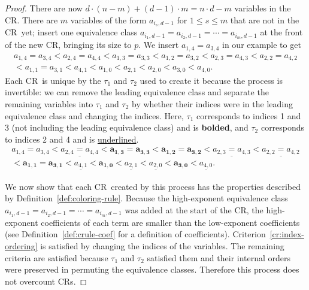\documentclass[11pt]{article}
\newcommand{\crulenospace}{CR}
\newcommand{\crule}{\crulenospace~}
\newcommand{\crulesnospace}{\crulenospace s}
\newcommand{\numpoints}{n}
\newcommand{\inumpoints}{i}
\newcommand{\commonconst}{a}
\theoremstyle{plain}
\theoremstyle{definition}
\begin{document}
\begin{proof}
There are now $d \cdot (\numpoints - m) + (d - 1) \cdot m = \numpoints \cdot d - m$ variables in the \crulenospace. There are $m$ variables of the form $\commonconst_{\inumpoints_s,d-1}$ for $1 \leq s \leq m$ that are not in the \crule yet; insert one equivalence class $\commonconst_{\inumpoints_1,d-1} = \commonconst_{\inumpoints_2,d-1} = \cdots = \commonconst_{\inumpoints_m,d-1}$ at the front of the new \crulenospace, bringing its size to $p$. We insert $\commonconst_{1,4}=\commonconst_{3,4}$ in our example to get \begin{align*}
\commonconst_{1,4}=\commonconst_{3,4} < \commonconst_{2,4} = \commonconst_{4,4} < \commonconst_{1,3} = \commonconst_{3,3} < \commonconst_{1,2} = \commonconst_{3,2} < \commonconst_{2,3} = \commonconst_{4,3} < \commonconst_{2,2} = \commonconst_{4,2} \\ < \commonconst_{1,1} = \commonconst_{3,1} < \commonconst_{4,1} < \commonconst_{1,0} < \commonconst_{2,1} < \commonconst_{2,0} < \commonconst_{3,0} < \commonconst_{4,0}.
\end{align*} 
Each \crule is unique by the $\tau_1$ and $\tau_2$ used to create it because the process is invertible: we can remove the leading equivalence class and separate the remaining variables into $\tau_1$ and $\tau_2$ by whether their indices were in the leading equivalence class and changing the indices. Here, $\tau_1$ corresponds to indices 1 and 3 (not including the leading equivalence class) and is \textbf{bolded}, and $\tau_2$ corresponds to indices 2 and 4 and is \underline{underlined}.
\begin{align*}
\commonconst_{1,4}=\commonconst_{3,4} < \underline{\commonconst_{2,4} = \commonconst_{4,4}} < \mathbf{\commonconst_{1,3} = \commonconst_{3,3}} < \mathbf{\commonconst_{1,2} = \commonconst_{3,2}} < \underline{\commonconst_{2,3} = \commonconst_{4,3}} < \underline{\commonconst_{2,2} = \commonconst_{4,2}} \\ < \mathbf{\commonconst_{1,1} = \commonconst_{3,1}} < \underline{\commonconst_{4,1}} < \mathbf{\commonconst_{1,0}} < \underline{\commonconst_{2,1}} < \underline{\commonconst_{2,0}} < \mathbf{\commonconst_{3,0}} < \underline{\commonconst_{4,0}}.
\end{align*}

We now show that each \crule created by this process has the properties described by Definition~\ref{def:coloring-rule}. Because the high-exponent equivalence class $\commonconst_{\inumpoints_1,d-1} = \commonconst_{\inumpoints_2,d-1} = \cdots = \commonconst_{\inumpoints_m,d-1}$ was added at the start of the \crulenospace, the high-exponent coefficients of each term are smaller than the low-exponent coefficients (see
Definition~\ref{def:crule-coef} for a definition of coefficients). 
Criterion~\ref{cr:index-ordering} is satisfied by changing the indices of the variables.
The remaining criteria are satisfied because $\tau_1$ and $\tau_2$ satisfied them and their internal orders were preserved in permuting the equivalence classes. Therefore this process does not overcount \crulesnospace.


\end{proof}
\end{document}
